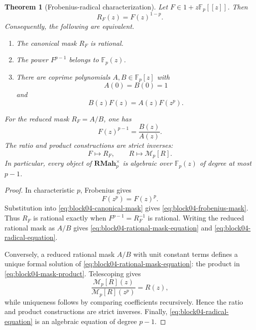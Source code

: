 \documentclass[11pt]{article}
\newtheorem{theorem}{Theorem}[section]
\theoremstyle{definition}
\theoremstyle{remark}
\newcommand{\RMah}{\mathbf{RMah}}
\begin{document}
\begin{theorem}[Frobenius-radical characterization]
\label{thm:frobenius-radical-characterization}
Let \(F\in1+z\mathbb F_p[[z]]\).  Then
\begin{equation}
\label{eq:block04-frobenius-mask}
R_F(z)=F(z)^{1-p}.
\end{equation}
Consequently, the following are equivalent.
\begin{enumerate}[label=\textup{(\roman*)}]
\item The canonical mask \(R_F\) is rational.
\item The power \(F^{p-1}\) belongs to \(\mathbb F_p(z)\).
\item There are coprime polynomials \(A,B\in\mathbb F_p[z]\) with
\[
A(0)=B(0)=1
\]
and
\begin{equation}
\label{eq:block04-rational-mask-equation}
B(z)F(z)=A(z)F(z^p).
\end{equation}
\end{enumerate}
For the reduced mask \(R_F=A/B\), one has
\begin{equation}
\label{eq:block04-radical-equation}
F(z)^{p-1}=\frac{B(z)}{A(z)}.
\end{equation}
The ratio and product constructions are strict inverses:
\[
F\longmapsto R_F,
\qquad
R\longmapsto\mathcal M_p[R].
\]
In particular, every object of \(\RMah_p^{\times}\) is algebraic over \(\mathbb F_p(z)\) of degree at most \(p-1\).
\end{theorem}

\begin{proof}
In characteristic \(p\), Frobenius gives
\[
F(z^p)=F(z)^p.
\]
Substitution into \cref{eq:block04-canonical-mask} gives \cref{eq:block04-frobenius-mask}.  Thus \(R_F\) is rational exactly when \(F^{p-1}=R_F^{-1}\) is rational.  Writing the reduced rational mask as \(A/B\) gives \cref{eq:block04-rational-mask-equation} and \cref{eq:block04-radical-equation}.

Conversely, a reduced rational mask \(A/B\) with unit constant terms defines a unique formal solution of \cref{eq:block04-rational-mask-equation}: the product in \cref{eq:block04-mask-product}.  Telescoping gives
\[
\frac{\mathcal M_p[R](z)}{\mathcal M_p[R](z^p)}=R(z),
\]
while uniqueness follows by comparing coefficients recursively.  Hence the ratio and product constructions are strict inverses.  Finally, \cref{eq:block04-radical-equation} is an algebraic equation of degree \(p-1\).
\end{proof}
\end{document}
